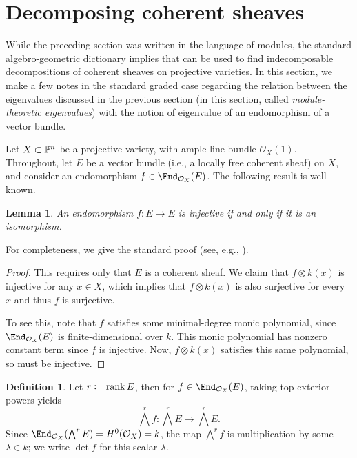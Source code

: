 \documentclass[12pt]{amsart}
\def\OO{\mathcal O}
\theoremstyle{theorem}
\numberwithin{thm}{section}
\newtheorem{lem}[thm]{Lemma}
\theoremstyle{definition}
\newtheorem{dfn}[thm]{Definition}
\begin{document}
\section{Decomposing coherent sheaves}\label{sec:coherent}

While the preceding section was written in the language of modules, the standard algebro-geometric dictionary implies that  can be used to find indecomposable decompositions of coherent sheaves on projective varieties.
In this section, we make a few notes in the standard graded case regarding the relation between the eigenvalues discussed in the previous section (in this section, called \emph{module-theoretic eigenvalues}) with the notion of eigenvalue of an endomorphism of a vector bundle.

Let $X\subset \P^n$ be a projective variety, with ample line bundle $\OO_X(1)$.
Throughout, let $E$ be a vector bundle (i.e., a locally free coherent sheaf) on $X$, and consider an endomorphism $f\in\End_{\OO_X}(E)$. The following result is well-known.

\begin{lem}\label{lem:inj-iff-iso}
  An endomorphism $f\colon E\to E$ is injective if and only if it is an isomorphism.
\end{lem}

For completeness, we give the standard proof (see, e.g., \cite[Exercise~4.1]{Friedman98}).

\begin{proof}
  This requires only that $E$ is a coherent sheaf. We claim that $f\otimes k(x)$ is injective for any $x\in X$, which implies that $f\otimes k(x)$ is also surjective for every $x$ and thus $f$ is surjective.

  To see this, note that $f$ satisfies some minimal-degree monic polynomial, since $\End_{\OO_X}(E)$ is finite-dimensional over $k$. This monic polynomial has nonzero constant term since $f$ is injective. Now, $f\otimes k(x)$ satisfies this same polynomial, so must be injective.
\end{proof}

\begin{dfn}
  Let $r\coloneqq\rank E$, then for $f\in \End_{\OO_X}(E)$, taking top exterior powers yields
  \[\textstyle \bigwedge^r f\colon \bigwedge^r E \to \bigwedge^r E. \]
  Since $\End_{\OO_X}(\bigwedge^r E) = H^0(\OO_X)=k$, the map $\bigwedge^r f$ is multiplication by some $\lambda\in k$; we write $\det f$ for this scalar $\lambda$.
\end{dfn}
\end{document}
